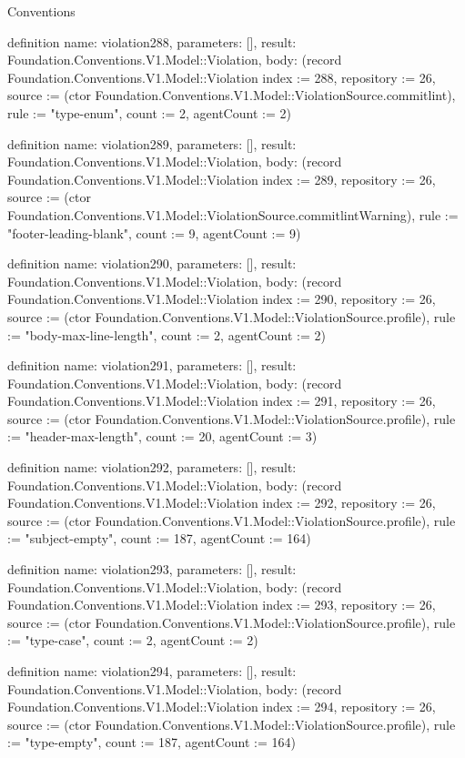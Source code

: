 \begin{lexlean}{Conventions}
\begin{semanticmodule}
definition{
  name: violation288,
  parameters: [],
  result: Foundation.Conventions.V1.Model::Violation,
  body: (record Foundation.Conventions.V1.Model::Violation {index := 288, repository := 26, source := (ctor Foundation.Conventions.V1.Model::ViolationSource.commitlint), rule := "type-enum", count := 2, agentCount := 2})
}

definition{
  name: violation289,
  parameters: [],
  result: Foundation.Conventions.V1.Model::Violation,
  body: (record Foundation.Conventions.V1.Model::Violation {index := 289, repository := 26, source := (ctor Foundation.Conventions.V1.Model::ViolationSource.commitlintWarning), rule := "footer-leading-blank", count := 9, agentCount := 9})
}

definition{
  name: violation290,
  parameters: [],
  result: Foundation.Conventions.V1.Model::Violation,
  body: (record Foundation.Conventions.V1.Model::Violation {index := 290, repository := 26, source := (ctor Foundation.Conventions.V1.Model::ViolationSource.profile), rule := "body-max-line-length", count := 2, agentCount := 2})
}

definition{
  name: violation291,
  parameters: [],
  result: Foundation.Conventions.V1.Model::Violation,
  body: (record Foundation.Conventions.V1.Model::Violation {index := 291, repository := 26, source := (ctor Foundation.Conventions.V1.Model::ViolationSource.profile), rule := "header-max-length", count := 20, agentCount := 3})
}

definition{
  name: violation292,
  parameters: [],
  result: Foundation.Conventions.V1.Model::Violation,
  body: (record Foundation.Conventions.V1.Model::Violation {index := 292, repository := 26, source := (ctor Foundation.Conventions.V1.Model::ViolationSource.profile), rule := "subject-empty", count := 187, agentCount := 164})
}

definition{
  name: violation293,
  parameters: [],
  result: Foundation.Conventions.V1.Model::Violation,
  body: (record Foundation.Conventions.V1.Model::Violation {index := 293, repository := 26, source := (ctor Foundation.Conventions.V1.Model::ViolationSource.profile), rule := "type-case", count := 2, agentCount := 2})
}

definition{
  name: violation294,
  parameters: [],
  result: Foundation.Conventions.V1.Model::Violation,
  body: (record Foundation.Conventions.V1.Model::Violation {index := 294, repository := 26, source := (ctor Foundation.Conventions.V1.Model::ViolationSource.profile), rule := "type-empty", count := 187, agentCount := 164})
}


\end{semanticmodule}
\end{lexlean}
